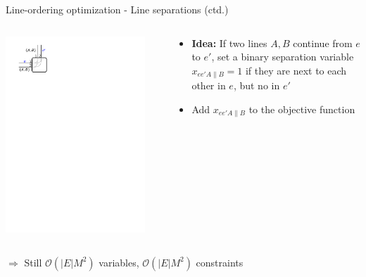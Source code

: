 \documentclass{beamer}
\begin{document}
\begin{frame}{Line-ordering optimization - Line separations (ctd.)}	
	\begin{columns}[T]
		\begin{column}{0.25\textwidth}
			\centering\includegraphics[width=0.9\textwidth, page=3]{figures/crossing.pdf}
		\end{column}
		\begin{column}[T]{0.75\textwidth}			
			\begin{itemize}[<+->]
				\item \alert{\textbf{Idea:}} If two lines $A, B$ continue from $e$ to $e'$, set a binary separation variable $x_{ee'A\|B} = 1$ if they are next to each other in $e$, but no in $e'$
				\item Add $x_{ee'A\|B}$ to the objective function
			\end{itemize}
		\end{column}
	\end{columns}

	\vspace{1cm}
	\pause[\thebeamerpauses]
	$\Rightarrow$ Still $\mathcal{O}(|E|M^2)$ variables, $\mathcal{O}(|E|M^2)$ constraints
\end{frame}
\end{document}

